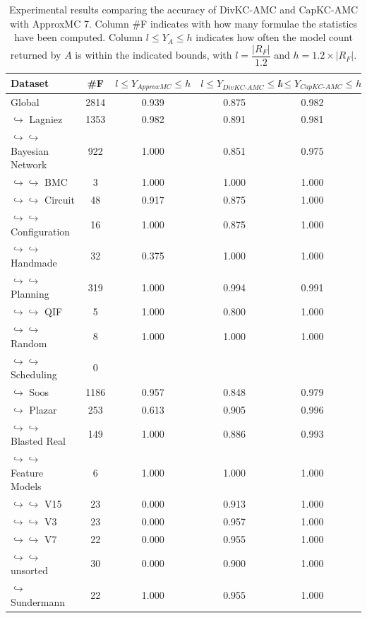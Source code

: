 \documentclass{article}
\newcommand\approxmc[0]{ApproxMC\xspace}
\newcommand\divkcamc[0]{DivKC-AMC\xspace}
\newcommand\capkcamc[0]{CapKC-AMC\xspace}
\begin{document}
    
\begin{table}[h!]
        \centering
            \begin{tabular}{l|c|c|c|c|c}
                Dataset & \#F & $l \leq Y_{\textit{\approxmc}} \leq h$ & $l \leq Y_{\textit{\divkcamc}} \leq h$ & $l \leq Y_{\textit{\capkcamc}} \leq h$ \\ 
                \hline 
Global & 2814 & 0.939 & 0.875 & 0.982 \\
$\hookrightarrow$ Lagniez \cite{D4} & 1353 & 0.982 & 0.891 & 0.981 \\
$\hookrightarrow \hookrightarrow$ Bayesian Network & 922 & 1.000 & 0.851 & 0.975 \\
$\hookrightarrow \hookrightarrow$ BMC & 3 & 1.000 & 1.000 & 1.000 \\
$\hookrightarrow \hookrightarrow$ Circuit & 48 & 0.917 & 0.875 & 1.000 \\
$\hookrightarrow \hookrightarrow$ Configuration & 16 & 1.000 & 0.875 & 1.000 \\
$\hookrightarrow \hookrightarrow$ Handmade & 32 & 0.375 & 1.000 & 1.000 \\
$\hookrightarrow \hookrightarrow$ Planning & 319 & 1.000 & 0.994 & 0.991 \\
$\hookrightarrow \hookrightarrow$ QIF & 5 & 1.000 & 0.800 & 1.000 \\
$\hookrightarrow \hookrightarrow$ Random & 8 & 1.000 & 1.000 & 1.000 \\
$\hookrightarrow \hookrightarrow$ Scheduling & 0 & & & & \\
$\hookrightarrow$ Soos \cite{soos_2024_10449477} & 1186 & 0.957 & 0.848 & 0.979 \\
$\hookrightarrow$ Plazar \cite{Plazar2019} & 253 & 0.613 & 0.905 & 0.996 \\
$\hookrightarrow \hookrightarrow$ Blasted Real & 149 & 1.000 & 0.886 & 0.993 \\
$\hookrightarrow \hookrightarrow$ Feature Models & 6 & 1.000 & 1.000 & 1.000 \\
$\hookrightarrow \hookrightarrow$ V15 & 23 & 0.000 & 0.913 & 1.000 \\
$\hookrightarrow \hookrightarrow$ V3 & 23 & 0.000 & 0.957 & 1.000 \\
$\hookrightarrow \hookrightarrow$ V7 & 22 & 0.000 & 0.955 & 1.000 \\
$\hookrightarrow \hookrightarrow$ unsorted & 30 & 0.000 & 0.900 & 1.000 \\
$\hookrightarrow$ Sundermann \cite{SBK+:SPLC24} & 22 & 1.000 & 0.955 & 1.000 \\
            \end{tabular}
                \caption{Experimental results comparing the accuracy of \divkcamc and \capkcamc with \approxmc7.
            Column \#F indicates with how many formulae the statistics have been computed.
            Column $l \leq Y_{A} \leq h$ indicates how often the model count returned by $A$ is within the indicated bounds, with $l = \dfrac{|R_F|}{1.2}$ and $h = 1.2 \times |R_F|$.
        }
        \label{divkc:tab:appmc:acc}
    \end{table}
\end{document}
